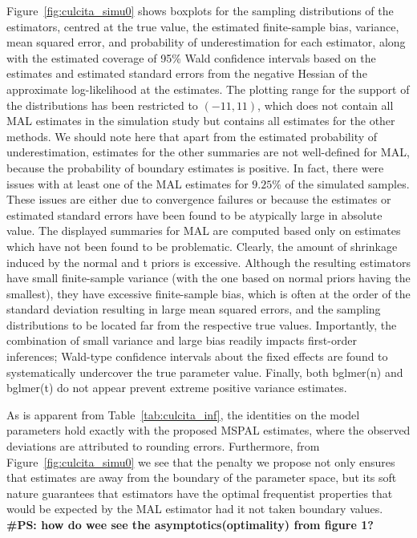 \documentclass[11pt, a4paper]{article}
\newcommand{\PS}[1]{{\noindent \color{red} \bf \#PS: #1}}
\theoremstyle{example} \newtheorem{example}{Example}[section]
\theoremstyle{theorem} \newtheorem{theorem}{Theorem}[section]
\begin{document}
Figure~\ref{fig:culcita_simu0} shows boxplots for the sampling
distributions of the estimators, centred at the true value, the estimated
finite-sample bias, variance, mean squared error, and probability of
underestimation for each estimator, along with the estimated coverage
of 95\% Wald confidence intervals based on the estimates and estimated
standard errors from the negative Hessian of the approximate
log-likelihood at the estimates. The plotting range for the support of
the distributions has been restricted to $(-11, 11)$, which does not
contain all MAL estimates in the simulation study but contains all
estimates for the other methods. We should note here that apart from
the estimated probability of underestimation,
estimates for the other summaries are not well-defined for MAL,
because the probability of boundary estimates is positive. In fact,
there were issues with at least one of the MAL estimates for $9.25\%$
of the simulated samples. These issues are either due to convergence
failures or because the estimates or estimated standard errors have
been found to be atypically large in absolute value. The displayed
summaries for MAL are computed based only on estimates which have not
been found to be problematic. Clearly, the amount of shrinkage induced
by the normal and t priors is excessive. Although the resulting
estimators have small finite-sample variance (with the one based on
normal priors having the smallest), they have excessive finite-sample
bias, which is often at the order of the standard deviation resulting
in large mean squared errors, and the sampling distributions to be
located far from the respective true values. Importantly, the
combination of small variance and large bias readily impacts
first-order inferences; Wald-type confidence intervals about the fixed
effects are found to systematically undercover the true parameter
value. Finally, both bglmer(n) and bglmer(t) do not appear prevent extreme positive variance estimates.

As is apparent from Table~\ref{tab:culcita_inf}, the identities on the
model parameters hold exactly with the proposed MSPAL estimates, where the observed deviations are attributed to rounding errors. Furthermore, from
Figure~\ref{fig:culcita_simu0} we see that the penalty we propose not only ensures
that estimates are away from the boundary of the parameter space, but
its soft nature guarantees that estimators have the optimal
frequentist properties that would be expected by the MAL estimator
had it not taken boundary values. \PS{how do wee see the asymptotics(optimality) from figure 1?}
\end{document}
